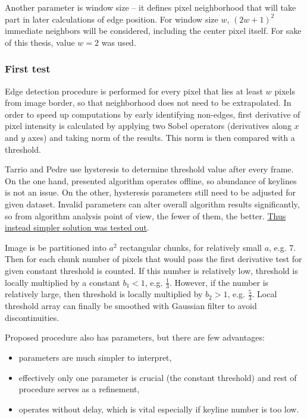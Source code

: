 Another parameter is window size -- it defines pixel neighborhood that will take part in later calculations of edge position. For window size $w$, $(2w+1)^2$ immediate neighbors will be considered, including the center pixel itself. For sake of this thesis, value $w = 2$ was used.

\subsubsection{First test}
\label{edge_first}

Edge detection procedure is performed for every pixel that lies at least $w$ pixels from image border, so that neighborhood does not need to be extrapolated. In order to speed up computations by early identifying non-edges, first derivative of pixel intensity is calculated by applying two Sobel operators (derivatives along $x$ and $y$ axes) and taking norm of the results. This norm is then compared with a threshold. 

Tarrio and Pedre use hysteresis to determine threshold value after every frame. On the one hand, presented algorithm operates offline, so abundance of keylines is not an issue. On the other, hysteresis parameters still need to be adjusted for given dataset. Invalid parameters can alter overall algorithm results significantly, so from algorithm analysis point of view, the fewer of them, the better. \underline{Thus instead simpler solution was tested out}.

Image is be partitioned into $a^2$ rectangular chunks, for relatively small $a$, e.g. 7. Then for each chunk number of pixels that would pass the first derivative test for given constant threshold is counted. If this number is relatively low, threshold is locally multiplied by a constant ${b_{1} < 1}$, e.g. $\frac{1}{3}$. However, if the number is relatively large, then threshold is locally multiplied by ${b_{2} > 1}$, e.g. $\frac{5}{3}$. Local threshold array can finally be smoothed with Gaussian filter to avoid discontinuities.

Proposed procedure also has parameters, but there are few advantages:
\begin{itemize}
	\item parameters are much simpler to interpret,
	\item effectively only one parameter is crucial (the constant threshold) and rest of procedure serves as a refinement,
	\item operates without delay, which is vital especially if keyline number is too low.
\end{itemize}

